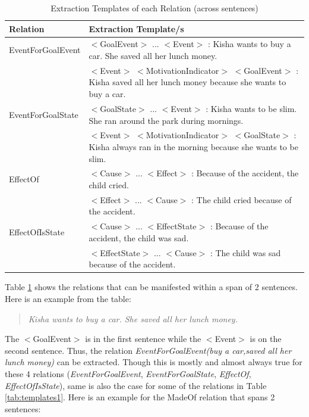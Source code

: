 \begin{table}[H]   %
\centering
\caption{Extraction Templates of each Relation (across sentences)} \vspace{0.25em}
\begin{tabular}{|p{3.5cm}|p{10cm}|} \hline
\textbf{Relation} & \textbf{Extraction Template/s} \\ \hline
EventForGoalEvent	& $<$GoalEvent$>$ ... $<$Event$>$ : Kisha wants to buy a car. She saved all her lunch money. \\
					& $<$Event$>$ $<$MotivationIndicator$>$ $<$GoalEvent$>$ : Kisha saved all her lunch money because she wants to buy a car. \\ \hline
EventForGoalState	& $<$GoalState$>$ ... $<$Event$>$ :  Kisha wants to be slim. She ran around the park during mornings. \\
					& $<$Event$>$ $<$MotivationIndicator$>$ $<$GoalState$>$ : Kisha always ran in the morning because she wants to be slim. \\ \hline
EffectOf			& $<$Cause$>$ ... $<$Effect$>$ : Because of the accident, the child cried. \\
					& $<$Effect$>$ ... $<$Cause$>$ : The child cried because of the accident. \\ \hline			
EffectOfIsState		& $<$Cause$>$ ... $<$EffectState$>$ : Because of the accident, the child was sad. \\
					& $<$EffectState$>$ ... $<$Cause$>$ : The child was sad because of the accident. \\ \hline		
\end{tabular}
\label{tab:templates2}
\end{table}

Table \ref{tab:templates2} shows the relations that can be manifested within a span of 2 sentences. Here is an example from the table:

\begin{verse}
\itshape
Kisha wants to buy a car. She saved all her lunch money. \\
\end{verse}

The $<$GoalEvent$>$ is in the first sentence while the $<$Event$>$ is on the second sentence. Thus, the relation \textit{EventForGoalEvent(buy a car,saved all her lunch money)} can be extracted. Though this is mostly and almost always true for these 4 relations (\textit{EventForGoalEvent}, \textit{EventForGoalState}, \textit{EffectOf}, \textit{EffectOfIsState}), same is also the case for some of the relations in Table \ref{tab:templates1}. Here is an example for the MadeOf relation that spans 2 sentences:

